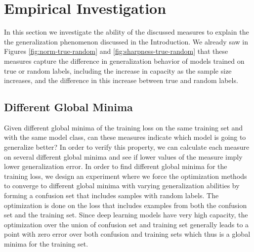 \documentclass{article}
\begin{document}

\section{Empirical Investigation}\label{sec:empirical}

In this section we investigate the ability of the discussed measures
to explain the the generalization phenomenon discussed in the
Introduction.  We already saw in Figures \ref{fig:norm-true-random}
and \ref{fig:sharpness-true-random} that these measures capture the
difference in generalization behavior of models trained on true or
random labels, including the increase in capacity as the sample size
increases, and the difference in this increase between true and random
labels.

\subsection*{Different Global Minima}

Given different global minima of the training loss on the same
training set and with the same model class, can these measures
indicate which model is going to generalize better? In order to verify
this property, we can calculate each measure on several different
global minima and see if lower values of the measure imply lower
generalization error. In order to find different global minima for the
training loss, we design an experiment where we force the optimization
methods to converge to different global minima with varying
generalization abilities by forming a confusion set that includes
samples with random labels. The optimization is done on the loss that
includes examples from both the confusion set and the training set.
Since deep learning models have very high capacity, the optimization
over the union of confusion set and training set generally leads to a
point with zero error over both confusion and training sets which thus
is a global minima for the training set.
\end{document}
